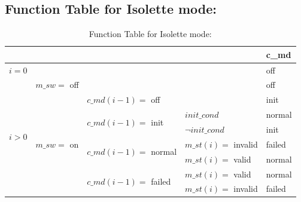 \documentclass[fontsize=12pt,paper=letter,twoside]{scrartcl}
\begin{document}
\subsection{Function Table for Isolette mode: }
\begin{table}[htb]
\centering
\begin{tabular}{llll|l|}
\cline{5-5}
                                                        &                                                  &                                                           &                    & c\_md  \\ \hline
\multicolumn{4}{|l|}{$i = 0$}                                                                                                                                                                 & off    \\ \hline
\multicolumn{1}{|l|}{\multirow{8}{*}{$i > 0$}} & \multicolumn{3}{l|}{$m\_sw =$ off}                                                                                                  & off    \\ \cline{2-5}
\multicolumn{1}{|l|}{}                                  & \multicolumn{1}{l|}{\multirow{7}{*}{$m\_sw =$ on}} & \multicolumn{2}{l|}{$c\_md(i-1) =$ off}                                          & init   \\ \cline{3-5}
\multicolumn{1}{|l|}{}                                  & \multicolumn{1}{l|}{}                            & \multicolumn{1}{l|}{\multirow{2}{*}{$c\_md(i-1) =$ init}}   & $init\_cond$ \footnotemark        & normal \\ \cline{4-5}
\multicolumn{1}{|l|}{}                                  & \multicolumn{1}{l|}{}                            & \multicolumn{1}{l|}{}                                     & $\neg init\_cond$     & init   \\ \cline{3-5}
\multicolumn{1}{|l|}{}                                  & \multicolumn{1}{l|}{}                            & \multicolumn{1}{l|}{\multirow{2}{*}{$c\_md(i-1) =$ normal}} & $m\_st(i) =$ invalid & failed   \\ \cline{4-5}
\multicolumn{1}{|l|}{}                                  & \multicolumn{1}{l|}{}                            & \multicolumn{1}{l|}{}                                     & $m\_st(i) =$ valid   & normal \\ \cline{3-5}
\multicolumn{1}{|l|}{}                                  & \multicolumn{1}{l|}{}                            & \multicolumn{1}{l|}{\multirow{2}{*}{$c\_md(i-1) =$ failed}}   & $m\_st(i) =$ valid   & normal \\ \cline{4-5}
\multicolumn{1}{|l|}{}                                  & \multicolumn{1}{l|}{}                            & \multicolumn{1}{l|}{}                                     & $m\_st(i) =$ invalid & failed   \\ \hline
\end{tabular}
\caption{Function Table for Isolette mode: }
\end{table}
\end{document}
